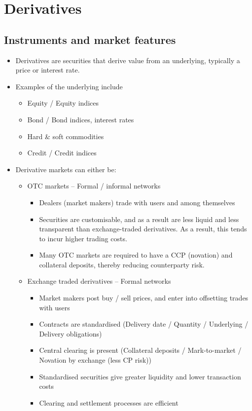 \documentclass[../notes_compiled.tex]{subfiles}
\begin{document}
\section{Derivatives}

\subsection{Instruments and market features}
\begin{itemize}
\item Derivatives are securities that derive value from an underlying, typically a price or interest rate.
\item Examples of the underlying include
\begin{multicols}{2}
\begin{itemize} 
\item  Equity / Equity indices
\item Bond / Bond indices, interest rates
\item Hard \& soft commodities
\item Credit / Credit indices
\end{itemize}
\end{multicols}
\item Derivative markets can either be:
\begin{itemize}
\item OTC markets -- Formal / informal networks
\begin{itemize}
\item Dealers (market makers) trade with users and among themselves
\item Securities are customisable, and as a result are less liquid and less transparent than exchange-traded derivatives. As a result, this tends to incur higher trading costs.
\item Many OTC markets are required to have a CCP (novation) and collateral deposits, thereby reducing counterparty risk.
\end{itemize}
\item Exchange traded derivatives -- Formal networks
\begin{itemize}
\item Market makers post buy / sell prices, and enter into offsetting trades with users
\item Contracts are standardised (Delivery date / Quantity / Underlying / Delivery obligations)
\item Central clearing is present (Collateral deposits / Mark-to-market / Novation by exchange (less CP risk))
\item Standardised securities give greater liquidity and lower transaction costs
\item Clearing and settlement processes are efficient
\end{itemize}
\end{itemize}


\end{itemize}
\end{document}
